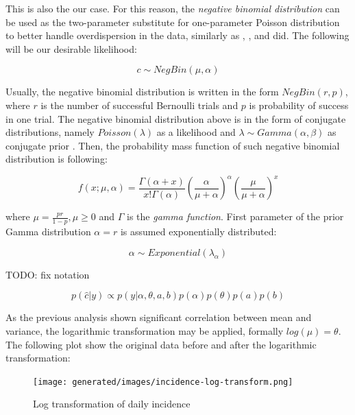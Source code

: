 \documentclass[
  digital, %
  oneside, %
  lof,     %
  lot,     %
]{fithesis4}
\begin{document}
This is also the our case. 
For this reason, the \textit{negative binomial distribution} can 
be used as the two-parameter substitute for 
one-parameter Poisson distribution to better 
handle overdispersion in the data, similarly 
as \cite{simone2020}, \cite{wallinga2004}, 
\cite{alzahrani2018} and \cite{manevski2020} did.
The following will be our desirable likelihood:

\begin{equation}
c \sim NegBin\left( \mu, \alpha \right)
\end{equation}

Usually, the negative binomial distribution is 
written in the form $NegBin \left( r, p \right)$, 
where $r$ is the number of successful Bernoulli 
trials and $p$ is probability of success in one 
trial. The negative binomial distribution above 
is in the form of conjugate distributions, namely 
$Poisson\left( \lambda \right)$ as a likelihood 
and $\lambda \sim Gamma\left( \alpha, \beta \right)$ as 
conjugate prior \cite{munezero2020}. 
Then, the probability mass function of such 
negative binomial distribution is following:

\begin{equation}
f \left( x; \mu, \alpha \right) = \frac{\Gamma \left( \alpha + x \right) }{x! \Gamma \left( \alpha \right)} \left( \frac{\alpha}{\mu + \alpha} \right)^{\alpha} \left( \frac{\mu}{\mu + \alpha} \right)^{x}
\end{equation}

where $\mu = \frac{pr}{1-p}, \mu \geq 0$ and 
$\Gamma$ is the \textit{gamma function}. 
First parameter of the prior Gamma distribution 
$\alpha = r$ is assumed exponentially distributed:

\begin{equation}
	\alpha \sim Exponential \left( \lambda_{\alpha} \right)
\end{equation}

TODO: fix notation

\begin{equation}
p(\hat{c}|y) \propto p(y|\alpha, \theta, a, b) p(\alpha) p(\theta) p(a) p(b)
\end{equation}

As the previous analysis shown significant 
correlation between mean and variance, the 
logarithmic transformation may be applied, 
formally $log\left( \mu \right) = \theta$. 
The following plot show the original data 
before and after the logarithmic transformation:

\begin{figure}[h]
  \begin{center}
    \texttt{[image: generated/images/incidence-log-transform.png]}
  \end{center}
  \caption{Log transformation of daily incidence}
  \label{fig:incidence-log-transform}
\end{figure}
\end{document}

